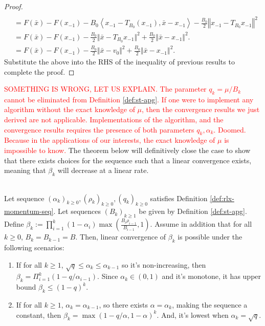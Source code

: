 \documentclass[12pt]{article}
\begin{document}
\begin{proof}
\begin{align*}
                \\
                &=
                F(\bar x) - F(x_{-1}) 
                - B_0\left\langle x_{-1} - T_{B_0}(x_{-1}), \bar x - x_{-1} \right\rangle
                - \frac{B_0}{2}\left\Vert x_{-1} - T_{B_0}x_{-1}\right\Vert^2
                \\
                &= 
                F(\bar x) - F(x_{-1}) 
                - \frac{B_0}{2}\Vert \bar x - T_{B_0}x_{-1}\Vert^2 
                + \frac{B_0}{2}\Vert \bar x - x_{-1}\Vert^2. 
                \\
                &= F(\bar x) - F(x_{-1}) 
                - \frac{B_0}{2}\Vert \bar x - v_0\Vert^2 
                + \frac{B_0}{2}\Vert \bar x - x_{-1}\Vert^2. 
            \end{align*}
            Substitute the above into the RHS of the inequality of previous results to complete the proof. 
        \end{proof}
        \par
        \textcolor{red}{
            SOMETHING IS WRONG, LET US EXPLAIN.
            The parameter $q_k = \mu/B_k$ cannot be eliminated from Definition \ref{def:st-apg}. 
            If one were to implement any algorithm without the exact knowledge of $\mu$, then the convergence results we just derived are not applicable. 
            Implementations of the algorithm, and the convergence results requires the presence of both parameters $q_k, \alpha_k$. 
            Doomed. 
            Because in the applications of our interests, the exact knowledge of $\mu$ is impossible to know. 
        }
        The theorem below will definitively close the case to show that there exists choices for the sequence such that a linear convergence exists, meaning that $\beta_k$ will decrease at a linear rate. 
        \begin{lemma}\;\label{lemma:beta-seq}\\
            Let sequence $(\alpha_k)_{k \ge 0}, (\rho_{k})_{k \ge 0}, (q_k)_{k \ge 0}$ satisfies Definition \ref{def:rlx-momentum-seq}.
            Let sequences $(B_k)_{k \ge 1}$ be given by Definition \ref{def:st-apg}. 
            Define $\beta_k := \prod_{i = 1}^k(1 - \alpha_i) \max \left(\frac{B_i\rho_{i - 1}}{B_{i - 1}}, 1\right)$.
            Assume in addition that for all $k \ge 0$, $B_k = B_{k - 1} = B$. 
            Then, linear convergence of $\beta_k$ is possible under the following scenarios: 
            \begin{enumerate}
                \item If for all $k \ge 1$, $\sqrt{q} \le \alpha_k \le \alpha_{k - 1}$ so it's non-increasing, then $\beta_k = \Pi_{i = 1}^k(1 - q/\alpha_{i - 1})$.
                Since $\alpha_k \in (0, 1)$ and it's monotone, it has upper bound $\beta_k \le (1 - q)^k$. 
                \item If for all $k \ge 1$, $\alpha_k = \alpha_{k - 1}$, so there exists $\alpha = \alpha_k$, making the sequence a constant, then $\beta_k = \max(1 - q/\alpha, 1 - \alpha)^k$. And, it's lowest when $\alpha_k = \sqrt{q}$. 
            \end{enumerate}
        \end{lemma}
\end{document}
